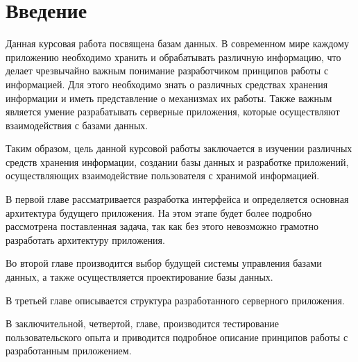 \section*{Введение}

Данная курсовая работа посвящена базам данных. В современном мире каждому приложению необходимо хранить и обрабатывать
различную информацию, что делает чрезвычайно важным понимание разработчиком принципов работы с информацией. Для этого
необходимо знать о различных средствах хранения информации и иметь представление о механизмах их работы. Также важным является
умение разрабатывать серверные приложения, которые осуществляют взаимодействия с базами данных.

Таким образом, цель данной курсовой работы заключается в изучении различных средств хранения информации, создании базы
данных и разработке приложений, осуществляющих взаимодействие пользователя с хранимой информацией.

В первой главе рассматривается разработка интерфейса и определяется основная архитектура будущего приложения. На этом этапе
будет более подробно рассмотрена поставленная задача, так как без этого невозможно грамотно разработать архитектуру приложения.

Во второй главе производится выбор будущей системы управления базами данных, а также осуществляется
проектирование базы данных.

В третьей главе описывается структура разработанного серверного приложения.

В заключительной, четвертой, главе, производится тестирование пользовательского опыта и приводится подробное
описание принципов работы с разработанным приложением.